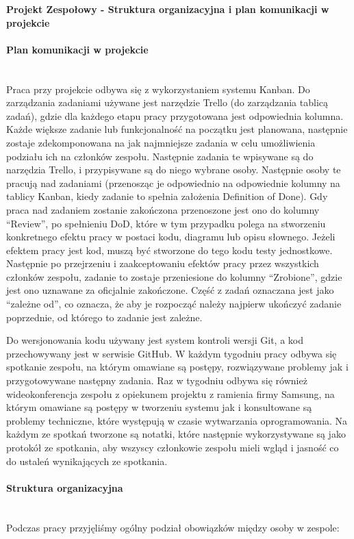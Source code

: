 \documentclass{article}
\begin{document}
\begin{center}
\textbf{Projekt Zespołowy - Struktura organizacyjna i plan komunikacji w projekcie}
\end{center}

\paragraph{Plan komunikacji w projekcie}\mbox{}\\
Praca przy projekcie odbywa się z wykorzystaniem systemu Kanban. Do zarządzania zadaniami używane jest narzędzie Trello (do zarządzania tablicą zadań), gdzie dla każdego etapu pracy przygotowana jest odpowiednia kolumna. Każde większe zadanie lub funkcjonalność na początku jest planowana, następnie zostaje zdekomponowana na jak najmniejsze zadania w celu umożliwienia podziału ich na członków zespołu. Następnie zadania te wpisywane są do narzędzia Trello, i przypisywane są do niego wybrane osoby. Następnie osoby te pracują nad zadaniami (przenosząc je odpowiednio na odpowiednie kolumny na tablicy Kanban, kiedy zadanie to spełnia założenia Definition of Done). Gdy praca nad zadaniem zostanie zakończona przenoszone jest ono do kolumny “Review”, po spełnieniu DoD, które w tym przypadku polega na stworzeniu konkretnego efektu pracy w postaci kodu, diagramu lub opisu słownego. Jeżeli efektem pracy jest kod, muszą być stworzone do tego kodu testy jednostkowe. Następnie po przejrzeniu i zaakceptowaniu efektów pracy przez wszystkich członków zespołu, zadanie to zostaje przeniesione do kolumny “Zrobione”, gdzie jest ono uznawane za oficjalnie zakończone. Część z zadań oznaczana jest jako “zależne od”, co oznacza, że aby je rozpocząć należy najpierw ukończyć zadanie poprzednie, od którego to zadanie jest zależne. 

Do wersjonowania kodu używany jest system kontroli wersji Git, a kod przechowywany jest w serwisie GitHub.
W każdym tygodniu pracy odbywa się spotkanie zespołu, na którym omawiane są postępy, rozwiązywane problemy jak i przygotowywane następny zadania. 
Raz w tygodniu odbywa się również wideokonferencja zespołu z opiekunem projektu z ramienia firmy Samsung, na którym omawiane są postępy w tworzeniu systemu jak i konsultowane są problemy techniczne, które występują w czasie wytwarzania oprogramowania. 
Na każdym ze spotkań tworzone są notatki, które następnie wykorzystywane są jako protokół ze spotkania, aby wszyscy członkowie zespołu mieli wgląd i jasność co do ustaleń wynikających ze spotkania.

\paragraph{Struktura organizacyjna}\mbox{}\\
Podczas pracy przyjęliśmy ogólny podział obowiązków między osoby w zespole:
\end{document}
